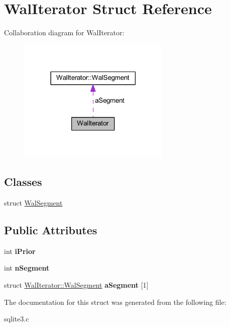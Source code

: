 \hypertarget{struct_wal_iterator}{\section{Wal\-Iterator Struct Reference}
\label{struct_wal_iterator}
}


Collaboration diagram for Wal\-Iterator\-:\nopagebreak
\begin{figure}[H]
\begin{center}
\leavevmode
\includegraphics[width=206pt]{struct_wal_iterator__coll__graph}
\end{center}
\end{figure}
\subsection*{Classes}
\begin{DoxyCompactItemize}
\item 
struct \hyperlink{struct_wal_iterator_1_1_wal_segment}{Wal\-Segment}
\end{DoxyCompactItemize}
\subsection*{Public Attributes}
\begin{DoxyCompactItemize}
\item 
\hypertarget{struct_wal_iterator_a2f906125490dd3e967fc53768b03abbb}{int {\bfseries i\-Prior}}\label{struct_wal_iterator_a2f906125490dd3e967fc53768b03abbb}

\item 
\hypertarget{struct_wal_iterator_ad81bc9447d6043212289d127dc9fdafa}{int {\bfseries n\-Segment}}\label{struct_wal_iterator_ad81bc9447d6043212289d127dc9fdafa}

\item 
\hypertarget{struct_wal_iterator_a6d3fcaaeeca5a0eee46f9fa7c3cb669b}{struct \hyperlink{struct_wal_iterator_1_1_wal_segment}{Wal\-Iterator\-::\-Wal\-Segment} {\bfseries a\-Segment} \mbox{[}1\mbox{]}}\label{struct_wal_iterator_a6d3fcaaeeca5a0eee46f9fa7c3cb669b}

\end{DoxyCompactItemize}


The documentation for this struct was generated from the following file\-:\begin{DoxyCompactItemize}
\item 
sqlite3.\-c\end{DoxyCompactItemize}
